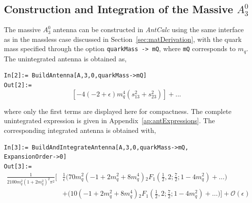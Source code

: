 \subsection{Construction and Integration of the Massive $A_3^0$}

The massive $A_3^0$ antenna can be constructed in \textit{AntCalc} using the same interface as
in the massless case discussed in Section~\ref{sec:matDerivation}, with the quark mass specified
through the option \texttt{quarkMass -> mQ}, where \texttt{mQ} corresponds to $m_q$. The
unintegrated antenna is obtained as,

\begin{mdframed}[backgroundcolor=gray!10, linewidth=0pt]
\texttt{In[2]:= BuildAntenna[A,3,0,quarkMass->mQ]}\\
\hfill
\texttt{Out[2]:=}
    \begin{equation*}
        \left[-4(-2+\epsilon)m_q^4\!\left(s_{13}^2+s_{23}^2\right)\right]+...
    \end{equation*}
\end{mdframed}

where only the first terms are displayed here for compactness. The complete unintegrated
expression is given in Appendix~\ref{ap:antExpressions}. The corresponding integrated antenna is
obtained with,

\begin{mdframed}[backgroundcolor=gray!10, linewidth=0pt]
\texttt{In[3]:= BuildAndIntegrateAntenna[A,3,0,quarkMass->mQ,\\ExpansionOrder->0]}\\
\hfill
\texttt{Out[3]:=}
    \begin{equation*}
        \begin{split}
            \frac1{2100m_q^2\!\left(1+2m_q^2\right)^2\pi^2}\Bigg[&\frac1\epsilon\Bigg(70m_q^2\!\left(-1+2m_q^2+8m_q^4\right){}_2F_1\!\left(\frac12,2;\frac72;1-4m_q^2\right)+...\Bigg)\\
                                                                 &+\Bigg(10\!\left(-1+2m_q^2+8m_q^4\right){}_2F_1\!\left(\frac12,2;\frac72;1-4m_q^2\right)+...\Bigg)\Bigg] + \mathcal O(\epsilon)
        \end{split}
    \end{equation*}
\end{mdframed}

